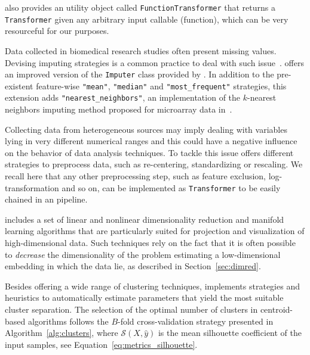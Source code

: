 

\sklearn also provides an utility object called {\tt FunctionTransformer} that returns a {\tt Transformer} given any arbitrary input callable (\ie function), which can be very resourceful for our purposes.

Data collected in biomedical research studies often present missing values.
Devising imputing strategies is a common practice to deal with such issue~\cite{de2015impact}.
\ade offers an improved version of the {\tt Imputer} class provided by \sklearn. In addition to the pre-existent feature-wise {\color{string} {\tt "mean"}}, {\color{string} {\tt "median"}} and {\color{string} {\tt "most\_frequent"}} strategies, this extension adds {\color{string} {\tt "nearest\_neighbors"}}, \ie an implementation of the $k$-nearest neighbors imputing method proposed for microarray data in~\cite{troyanskaya2001missing}.

Collecting data from heterogeneous sources may imply dealing with variables lying in very different numerical ranges and this could have a negative influence on the behavior of data analysis techniques. To tackle this issue \ade offers different strategies to preprocess data, such as re-centering, standardizing or rescaling. We recall here that any other preprocessing step, such as feature exclusion, log-transformation and so on, can be implemented as {\tt Transformer} to be easily chained in an \ade pipeline.

\ade includes a set of linear and nonlinear dimensionality reduction and manifold learning algorithms that are particularly suited for projection and visualization of high-dimensional data. Such techniques rely on the fact that it is often possible to \emph{decrease} the dimensionality of the problem estimating a low-dimensional embedding in which the data lie, as described in Section~\ref{sec:dimred}.

Besides offering a wide range of clustering techniques,
\ade implements strategies and heuristics to automatically estimate parameters that yield the most suitable cluster separation.
The selection of the optimal number of clusters in centroid-based algorithms follows the $B$-fold cross-validation strategy presented in Algorithm~\ref{alg:clusters}, where $\mathcal{S}(X,\hat y)$ is the mean silhouette coefficient of the input samples, see Equation~\eqref{eq:metrics_silhouette}.

